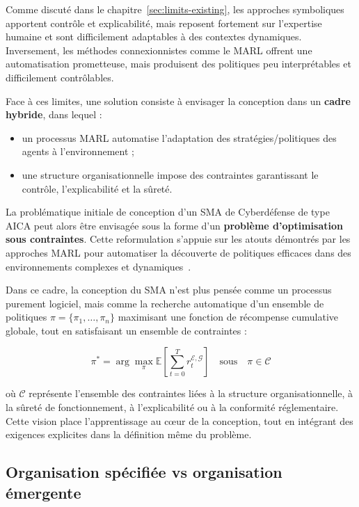 Comme discuté dans le chapitre~\ref{sec:limits-existing}, les approches symboliques apportent contrôle et explicabilité, mais reposent fortement sur l'expertise humaine et sont difficilement adaptables à des contextes dynamiques. Inversement, les méthodes connexionnistes comme le \ac{MARL} offrent une automatisation prometteuse, mais produisent des politiques peu interprétables et difficilement contrôlables.

Face à ces limites, une solution consiste à envisager la conception  dans un \textbf{cadre hybride}, dans lequel :
\begin{itemize}
    \item un processus \ac{MARL} automatise l'adaptation des stratégies/politiques des agents à l'environnement ;
    \item une structure organisationnelle impose des contraintes garantissant le contrôle, l'explicabilité et la sûreté.
\end{itemize}

La problématique initiale de conception d'un \ac{SMA} de Cyberdéfense de type \ac{AICA} peut alors être envisagée sous la forme d'un \textbf{problème d'optimisation sous contraintes}. Cette reformulation s'appuie sur les atouts démontrés par les approches \ac{MARL} pour automatiser la découverte de politiques efficaces dans des environnements complexes et dynamiques~\cite{Zhang2021, Papoudakis2021}.

Dans ce cadre, la conception du \ac{SMA} n'est plus pensée comme un processus purement logiciel, mais comme la recherche automatique d'un ensemble de politiques \(\pi = \{\pi_1, \dots, \pi_n\}\) maximisant une fonction de récompense cumulative globale, tout en satisfaisant un ensemble de contraintes :

\begin{equation}
    \pi^* = \arg\max_{\pi} \mathbb{E}\left[\sum_{t=0}^{T} r^{\mathcal{E},\mathcal{G}}_t\right] \quad \text{sous} \quad \pi \in \mathcal{C}
\end{equation}

où \(\mathcal{C}\) représente l'ensemble des contraintes liées à la structure organisationnelle, à la sûreté de fonctionnement, à l'explicabilité ou à la conformité réglementaire. Cette vision place l'apprentissage au cœur de la conception, tout en intégrant des exigences explicites dans la définition même du problème.


\subsection*{Organisation spécifiée vs organisation émergente}

